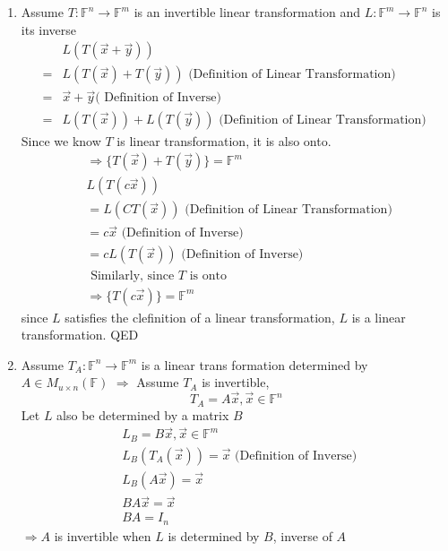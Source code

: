 \documentclass[11pt]{article}
\begin{document}
\begin{enumerate}[{\bf Q1.}]
\begin{enumerate}
			\item 
			Assume $T: \mathbb{F}^n \rightarrow \mathbb{F}^{m}$ is an invertible linear transformation and
			$L: \mathbb{F}^m \rightarrow \mathbb{F}^n$ is its inverse
			$$
			\begin{aligned}
			& L(T(\vec{x}+\vec{y})) \\
			= & L(T(\vec{x})+T(\vec{y})) \text { (Definition of Linear Transformation) } \\
			= & \vec{x}+\vec{y}(\text { Definition of Inverse) } \\
			= & L(T(\vec{x}))+L(T(\vec{y})) \text { (Definition of Linear Transformation) }
			\end{aligned}
			$$
			Since we know $T$ is linear transformation, it is also onto.
			$$
			\begin{aligned}
			& \Rightarrow\{T(\vec{x})+T(\vec{y})\}=\mathbb{F}^m \\
			& L(T(c \vec{x})) \\
			&= L(C T(\vec{x})) \text { (Definition of Linear Transformation) } \\
			&=c\vec{x} \text { (Definition of Inverse) } \\
			&= c L(T(\vec{x})) \text { (Definition of Inverse) } \\
			& \text { Similarly, since } T \text { is onto } \\
			& \Rightarrow\{T(c \vec{x})\}=\mathbb{F}^m
			\end{aligned}
			$$
			since $L$ satisfies the clefinition of a linear transformation, $L$ is a linear transformation.
			QED
			\item
			Assume $T_A: \mathbb{F}^n \rightarrow \mathbb{F}^m$ is a linear trans formation determined by $A \in M_{u \times n}(\mathbb{F})$
			\newline $\Rightarrow$ \newline
			Assume $T_A$ is invertible,
			$$
			T_A=A \vec{x}, \vec{x} \in \mathbb{F}^n
			$$
			Let $L$ also be determined by a matrix $B$
			$$
			\begin{aligned}
			& L_B=B \vec{x}, \vec{x} \in \mathbb{F}^m \\
			& L_B\left(T_A(\vec{x})\right)=\vec{x} \text { (Definition of Inverse) } \\
			& L_B(A \vec{x})=\vec{x} \\
			& B A \vec{x}=\vec{x} \\
			& B A=I_n
			\end{aligned}
			$$
			$\Rightarrow A$ is invertible when $L$ is determined by $B$, inverse of $A$

\end{enumerate}
\end{enumerate}
\end{document}
